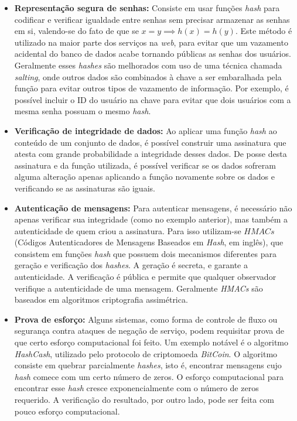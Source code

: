 \begin{itemize}
  \item \textbf{Representação segura de senhas:} Consiste em usar funções \emph{hash} para codificar e verificar igualdade entre senhas sem precisar armazenar as senhas em si, valendo-se do fato de que se $x = y \implies h(x) = h(y)$. Este método é utilizado na maior parte dos serviços na \emph{web}, para evitar que um vazamento acidental do banco de dados acabe tornando públicas as senhas dos usuários. Geralmente esses \emph{hashes} são melhorados com uso de uma técnica chamada \emph{salting}, onde outros dados são combinados à chave a ser embaralhada pela função para evitar outros tipos de vazamento de informação. Por exemplo, é possível incluir o ID do usuário na chave para evitar que dois usuários com a mesma senha possuam o mesmo \emph{hash}.

  \item \textbf{Verificação de integridade de dados:} Ao aplicar uma função \emph{hash} ao conteúdo de um conjunto de dados, é possível construir uma assinatura que atesta com grande probabilidade a integridade desses dados. De posse desta assinatura e da função utilizada, é possível verificar se os dados sofreram alguma alteração apenas aplicando a função novamente sobre os dados e verificando se as assinaturas são iguais.
  
  \item \textbf{Autenticação de mensagens:} Para autenticar mensagens, é necessário não apenas verificar sua integridade (como no exemplo anterior), mas também a autenticidade de quem criou a assinatura. Para isso utilizam-se $HMACs$ (Códigos Autenticadores de Mensagens Baseados em \emph{Hash}, em inglês), que consistem em funções \emph{hash} que possuem dois mecanismos diferentes para geração e verificação dos \emph{hashes}. A geração é secreta, e garante a autenticidade. A verificação é pública e permite que qualquer observador verifique a autenticidade de uma mensagem. Geralmente \emph{HMACs} são baseados em algoritmos criptografia assimétrica.
  
  \item \textbf{Prova de esforço:} Alguns sistemas, como forma de controle de fluxo ou segurança contra ataques de negação de serviço, podem requisitar prova de que certo esforço computacional foi feito. Um exemplo notável é o algoritmo \emph{HashCash}, utilizado pelo protocolo de criptomoeda \emph{BitCoin}. O algoritmo consiste em quebrar parcialmente \emph{hashes}, isto é, encontrar mensagens cujo \emph{hash} comece com um certo número de zeros. O esforço computacional para encontrar esse \emph{hash} cresce exponencialmente com o número de zeros requerido. A verificação do resultado, por outro lado, pode ser feita com pouco esforço computacional.
  
\end{itemize}

